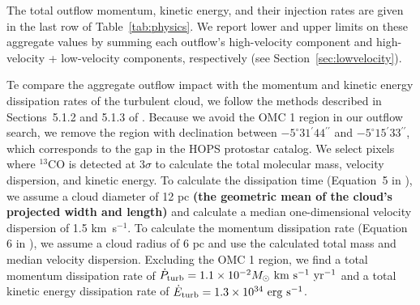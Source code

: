 \documentclass[twocolumn]{aastex63}
\newcommand{\co}[1][]{\ensuremath{^{#1}}CO}
\begin{document}
The total outflow momentum, kinetic energy, and their injection rates are given in the last row of Table~\ref{tab:physics}. We report lower and upper limits on these aggregate values by summing each outflow's high-velocity component and high-velocity + low-velocity components, respectively (see Section~\ref{sec:lowvelocity}). 

Te compare the aggregate outflow impact with the momentum and kinetic energy dissipation rates of the turbulent cloud, we follow the methods described in Sections~5.1.2 and 5.1.3 of \citet{Feddersen18}. Because we avoid the OMC 1 region in our outflow search, we remove the region with declination between $-5^\circ31{}^\prime44{}^{\prime\prime}$ and $-5^\circ15{}^\prime33{}^{\prime\prime}$, which corresponds to the gap in the HOPS protostar catalog. We select pixels where \co[13] is detected at 3$\sigma$ to calculate the total molecular mass, velocity dispersion, and kinetic energy. To calculate the dissipation time (Equation~5 in \citealp{Feddersen18}), we assume a cloud diameter of 12 pc \textbf{(the geometric mean of the cloud's projected width and length)} and calculate a median one-dimensional velocity dispersion of 1.5 km~s$^{-1}$. To calculate the momentum dissipation rate (Equation 6 in \citealp{Feddersen18}), we assume a cloud radius of 6 pc and use the calculated total mass and median velocity dispersion. Excluding the OMC 1 region, we find a total momentum dissipation rate of $\dot P_{\rm turb} = 1.1\times10^{-2}M_\odot~\rm{km}~\rm{s}^{-1}~\rm{yr}^{-1}$ and a total kinetic energy dissipation rate of $\dot E_{\rm turb} = 1.3\times10^{34}~\rm{erg}~\rm{s}^{-1}$.


\end{document}
